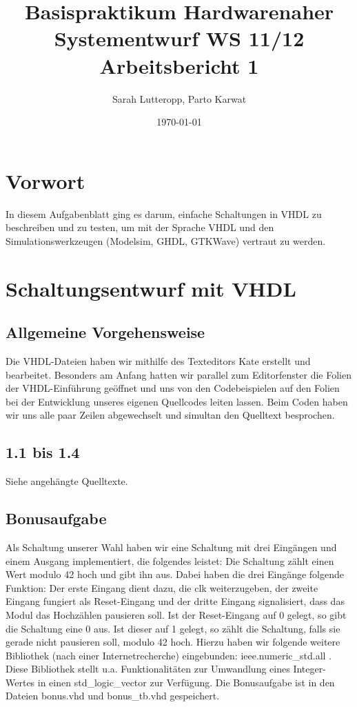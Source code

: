 \documentclass[a4paper, 11pt]{article}
\author{Sarah Lutteropp, Parto Karwat}
\title{Basispraktikum Hardwarenaher Systementwurf WS 11/12 \\ Arbeitsbericht 1}
\date{\today}
\theoremstyle{definition}
\theoremstyle{plain}
\begin{document}
\maketitle

\section{Vorwort}
In diesem Aufgabenblatt ging es darum, einfache Schaltungen in VHDL zu beschreiben und zu testen, um mit der Sprache VHDL und den Simulationswerkzeugen (Modelsim, GHDL, GTKWave) vertraut zu werden.

\section{Schaltungsentwurf mit VHDL}

\subsection{Allgemeine Vorgehensweise}
Die VHDL-Dateien haben wir mithilfe des Texteditors Kate erstellt und bearbeitet. Besonders am Anfang hatten wir parallel zum Editorfenster die Folien der VHDL-Einführung geöffnet und uns von den Codebeispielen auf den Folien bei der Entwicklung unseres eigenen Quellcodes leiten lassen. Beim Coden haben wir uns alle paar Zeilen abgewechselt und simultan den Quelltext besprochen.

\subsection{1.1 bis 1.4}
Siehe angehängte Quelltexte.

\subsection{Bonusaufgabe}
Als Schaltung unserer Wahl haben wir eine Schaltung mit drei Eingängen und einem Ausgang implementiert, die folgendes leistet: Die Schaltung zählt einen Wert modulo 42 hoch und gibt ihn aus. Dabei haben die drei Eingänge folgende Funktion: Der erste Eingang dient dazu, die clk weiterzugeben, der zweite Eingang fungiert als Reset-Eingang und der dritte Eingang signalisiert, dass das Modul das Hochzählen pausieren soll. Ist der Reset-Eingang auf 0 gelegt, so gibt die Schaltung eine 0 aus. Ist dieser auf 1 gelegt, so zählt die Schaltung, falls sie gerade nicht pausieren soll, modulo 42 hoch.
Hierzu haben wir folgende weitere Bibliothek (nach einer Internetrecherche) eingebunden: ieee.numeric\_std.all .
Diese Bibliothek stellt u.a. Funktionalitäten zur Umwandlung eines Integer-Wertes in einen std\_logic\_vector 
zur Verfügung. 
\newline
Die Bonusaufgabe ist in den Dateien bonus.vhd und bonus\_tb.vhd gespeichert.
\end{document}

